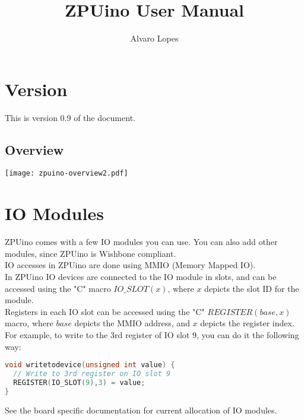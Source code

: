 \documentclass[12pt,a4paper,openany,smallheadings,headinclude,headsepline,final]{scrreprt}
\begin{document}
\parindent 0cm
\parskip 0.2cm

\title{ZPUino User Manual}
\author{Alvaro Lopes}
\maketitle

\tableofcontents
\clearpage

\chapter{Version}
This is version 0.9 of the document.

%
\section{Overview}
\texttt{[image: zpuino-overview2.pdf]}



\chapter{IO Modules}
ZPUino comes with a few IO modules you can use. You can also add other modules, since ZPUino is Wishbone compliant.\\
IO accesses in ZPUino are done using MMIO (Memory Mapped IO).\\
In ZPUino IO devices are connected to the IO module in slots, and can be accessed using the "C" macro $IO\_SLOT(x)$, where $x$
depicts the slot ID for the module.\\


Registers in each IO slot can be accessed using the "C" $REGISTER(base,x)$ macro, 
where $base$ depicts the MMIO address, and $x$ depicts the register index.\\

For example, to write to the 3rd register of IO slot 9, you can do it the following way:
\begin{lstlisting}[language=C++]
void writetodevice(unsigned int value) {
  // Write to 3rd register on IO slot 9 
  REGISTER(IO_SLOT(9),3) = value;
}
\end{lstlisting}

See the board specific documentation for current allocation of IO modules.
\end{document}
